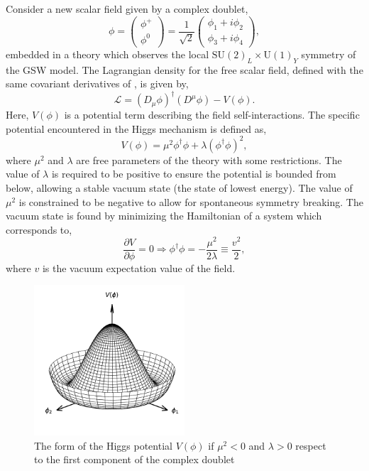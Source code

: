 Consider a new scalar field given by a complex doublet,
\begin{equation}
	\phi = \begin{pmatrix} \phi^+ \\ \phi^0 \end{pmatrix} = \frac{1}{\sqrt{2}} \begin{pmatrix} \phi_1 + i \phi_2 \\ \phi_3 + i \phi_4 \end{pmatrix},
\end{equation}
embedded in a theory which observes the local $\text{SU}(2)_L \times \text{U}(1)_Y$ symmetry of the GSW model.
The Lagrangian density for the free scalar field, defined with the same covariant derivatives of , is given by,
\begin{equation}
	\label{eq:higgs_lagrangian}
	\mathcal{L} = (D_\mu \phi)^\dagger (D^\mu \phi) - V(\phi).
\end{equation}
Here, $V(\phi)$ is a potential term describing the field self-interactions.
The specific potential encountered in the Higgs mechanism is defined as,
\begin{equation}
	\label{eq:higgs_potential}
	V(\phi) = \mu^2 \phi^\dagger \phi + \lambda (\phi^\dagger \phi)^2,
\end{equation}
where $\mu^2$ and $\lambda$ are free parameters of the theory with some restrictions.
The value of $\lambda$ is required to be positive to ensure the potential is bounded from below, allowing a stable vacuum state (the state of lowest energy).
The value of $\mu^2$ is constrained to be negative to allow for spontaneous symmetry breaking.
The vacuum state is found by minimizing the Hamiltonian of a system which corresponds to,
\begin{equation}
	\frac{\partial V}{\partial \phi} = 0 \Longrightarrow  \phi^\dagger \phi = -\frac{\mu^2}{2\lambda} \equiv \frac{v^2}{2},
\end{equation}
where $v$ is the vacuum expectation value of the field.

\begin{figure}[h]
	\centering
	\includegraphics[width=0.5\textwidth]{Figures/standard_model/mexican_hat_potential}
	\caption{The form of the Higgs potential $V(\phi)$ if $\mu^2 < 0$ and $\lambda > 0$ respect to the first component of the complex doublet}
	\label{fig:mexican_hat}
\end{figure}

